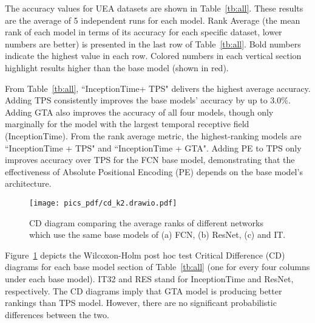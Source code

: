 \documentclass[journal]{IEEEtran}
\begin{document}
The accuracy values for UEA datasets are shown in Table~\ref{tb:all}. These results are the average   of 5 independent runs for each model. Rank Average (the mean rank of each model in terms of its accuracy for each specific dataset, lower numbers are better) is presented in the last row of Table~\ref{tb:all}. Bold numbers indicate the highest value in each row. Colored numbers in each vertical section highlight results higher than the base model (shown in red).

From Table~\ref{tb:all}, ``InceptionTime+ TPS" delivers the highest average accuracy. Adding TPS consistently improves the base models' accuracy by up to 3.0\%. Adding GTA also improves the accuracy of all four models, though only marginally for the model with the largest temporal receptive field (InceptionTime). From the rank average metric, the highest-ranking models are ``InceptionTime + TPS" and ``InceptionTime + GTA". Adding PE to TPS only improves accuracy over TPS for the FCN base model, demonstrating that the effectiveness of Absolute Positional Encoding (PE) depends on the base model's architecture. 

\begin{figure}[!t]
\centering
\texttt{[image: pics\_pdf/cd\_k2.drawio.pdf]}
\caption{CD diagram comparing the average ranks of different networks which use the same base models of (a) FCN, (b) ResNet, (c) and IT.}
\label{fig:cd}
\end{figure}
Figure~\ref{fig:cd} depicts the Wilcoxon-Holm post hoc test Critical Difference (CD) diagrams for each base model section of Table~\ref{tb:all} (one for every four columns under each base model). IT32 and RES stand for InceptionTime and ResNet, respectively. The CD diagrams imply that GTA model is producing better rankings than TPS model. However, there are no significant probabilistic differences between the two.
\end{document}
